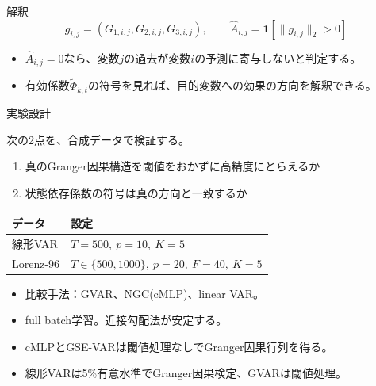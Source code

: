 \documentclass[dvipdfmx,11pt]{beamer}
\begin{document}
\begin{frame}{解釈}
  \vspace{0.4em}
  \[
    g_{i,j}
    =
    (G_{1,i,j},G_{2,i,j},G_{3,i,j}),
    \qquad
    \hat{A}_{i,j}
    =
    \mathbf{1}
    \left[
      \|g_{i,j}\|_2 > 0
    \right]
  \]

  \vspace{-0.4em}
  \center
  \scriptsize
  \begin{itemize}
    \item $\hat{A}_{i,j}=0$なら、変数$j$の過去が変数$i$の予測に寄与しないと判定する。
    \item 有効係数$\tilde{\Phi}_{k,t}$の符号を見れば、目的変数への効果の方向を解釈できる。
  \end{itemize}

\end{frame}

\begin{frame}{実験設計}
\small

次の2点を、合成データで検証する。
\begin{enumerate}
  \item 真のGranger因果構造を閾値をおかずに高精度にとらえるか
  \item 状態依存係数の符号は真の方向と一致するか
\end{enumerate}

\begin{table}
\centering
\scriptsize
\begin{tabular}{ll}
\toprule
データ & 設定 \\
\midrule
線形VAR
  & $T=500,\ p=10,\ K=5$ \\
Lorenz-96
  & $T\in\{500,1000\},\ p=20,\ F=40,\ K=5$ \\
\bottomrule
\end{tabular}
\end{table}

\begin{itemize}
  \item 比較手法：GVAR、NGC(cMLP)、linear VAR。
  \item full batch学習。近接勾配法が安定する。
  \item cMLPとGSE-VARは閾値処理なしでGranger因果行列を得る。
  \item 線形VARは5\%有意水準でGranger因果検定、GVARは閾値処理。
\end{itemize}
\end{frame}
\end{document}
